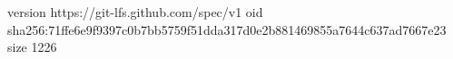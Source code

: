 version https://git-lfs.github.com/spec/v1
oid sha256:71ffe6e9f9397c0b7bb5759f51dda317d0e2b881469855a7644c637ad7667e23
size 1226
